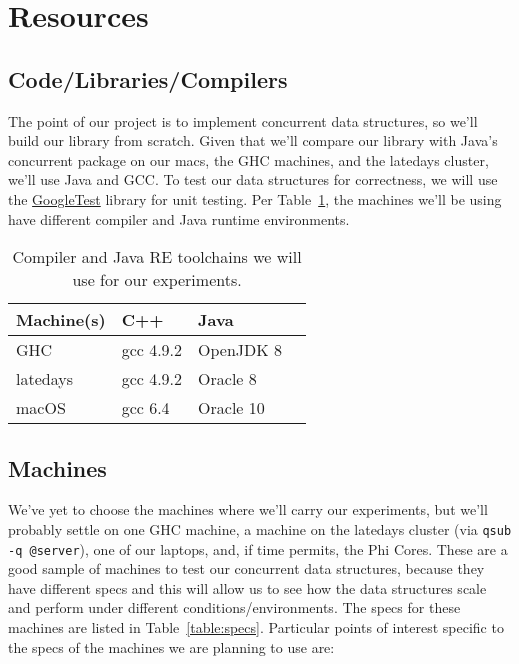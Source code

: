 \documentclass[11pt]{article}
\begin{document}
\section*{Resources}

\subsection*{Code/Libraries/Compilers}
The point of our project is to implement concurrent data structures, so we'll
build our library from scratch. Given that we'll compare our library with Java's
concurrent package on our macs, the GHC machines, and the latedays cluster,
we'll use Java and GCC. To test our data structures for correctness, we will use
the \href{https://github.com/google/googletest}{GoogleTest} library for unit
testing. Per Table~\ref{table:compiler}, the machines we'll be using have
different compiler and Java runtime environments.

\begin{table}[t]
\begin{center}
\begin{tabular}{llll}
\toprule
\bf Machine(s) & \bf C++ & \bf Java \\
\midrule
GHC            & gcc 4.9.2 & OpenJDK 8 \\
latedays       & gcc 4.9.2 & Oracle 8 \\
macOS          & gcc 6.4 & Oracle 10 \\
\bottomrule
\end{tabular}
\caption{Compiler and Java RE toolchains we will use for our experiments.}
\label{table:compiler}
\end{center}
\end{table}

\subsection*{Machines}
We've yet to choose the machines where we'll carry our experiments, but we'll
probably settle on one GHC machine, a machine on the latedays cluster (via
\texttt{qsub -q @server}), one of our laptops, and, if time permits, the Phi
Cores. These are a good sample of machines to test our concurrent data
structures, because they have different specs and this will allow us to see how
the data structures scale and perform under different conditions/environments.
The specs for these machines are listed in Table~\ref{table:specs}. Particular
points of interest specific to the specs of the machines we are planning to use
are:
\end{document}
